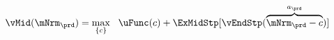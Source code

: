   \begin{equation}\begin{gathered}\begin{aligned}
        \vMid(\mNrm_{\prd}) & = \max_{\{{c}\}}~~\uFunc(c) +\ExMidStp[ \vEndStp(\overbrace{\mNrm_{\prd}-c}^{a_{\prd}})] \label{eq:vMid}
      \end{aligned}\end{gathered}\end{equation}
